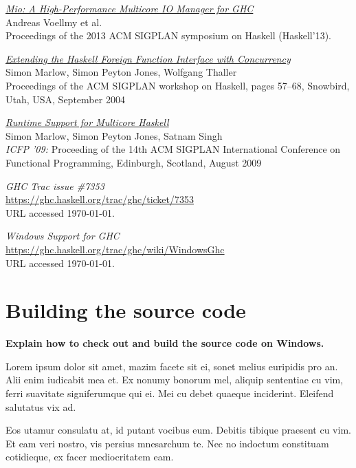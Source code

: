 \documentclass[a4paper,11pt,oneside]{report}
\begin{document}
\begin{thebibliography}{9}
  \href{http://haskell.cs.yale.edu/wp-content/uploads/2013/08/hask035-voellmy.pdf}{\emph{Mio:
      A High-Performance Multicore IO
      Manager for GHC}}\\
  \newblock Andreas Voellmy et al.\\
  \newblock Proceedings of the 2013 ACM SIGPLAN symposium on Haskell (Haskell'13).

  \href{http://community.haskell.org/~simonmar/bib/concffi04_abstract.html}{\emph{Extending the Haskell Foreign Function Interface with Concurrency}}\\
  \newblock Simon Marlow, Simon Peyton Jones, Wolfgang Thaller\\
  \newblock Proceedings of the ACM SIGPLAN workshop on Haskell, pages 57--68,
  Snowbird, Utah, USA, September 2004

  \href{http://community.haskell.org/~simonmar/bib/multicore-ghc-09_abstract.html}{\emph{Runtime Support for Multicore Haskell}}\\
  \newblock Simon Marlow, Simon Peyton Jones, Satnam Singh\\
  \newblock \emph{ICFP '09:} Proceeding of the 14th ACM SIGPLAN International
  Conference on Functional Programming, Edinburgh, Scotland, August 2009

 \emph{GHC Trac issue \#7353}\\
  \newblock \url{https://ghc.haskell.org/trac/ghc/ticket/7353}\\
  \newblock URL accessed \today.

 \emph{Windows Support for GHC}\\
  \newblock \url{https://ghc.haskell.org/trac/ghc/wiki/WindowsGhc}\\
  \newblock URL accessed \today.

\end{thebibliography}

\appendix

\chapter{Building the source code}

\textbf{Explain how to check out and build the source code on Windows.}

Lorem ipsum dolor sit amet, mazim facete sit ei, sonet melius euripidis pro
an. Alii enim iudicabit mea et. Ex nonumy bonorum mel, aliquip sententiae cu
vim, ferri suavitate signiferumque qui ei. Mei cu debet quaeque
inciderint. Eleifend salutatus vix ad.

Eos utamur consulatu at, id putant vocibus eum. Debitis tibique praesent cu
vim. Et eam veri nostro, vis persius mnesarchum te. Nec no indoctum constituam
cotidieque, ex facer mediocritatem eam.
\end{document}
